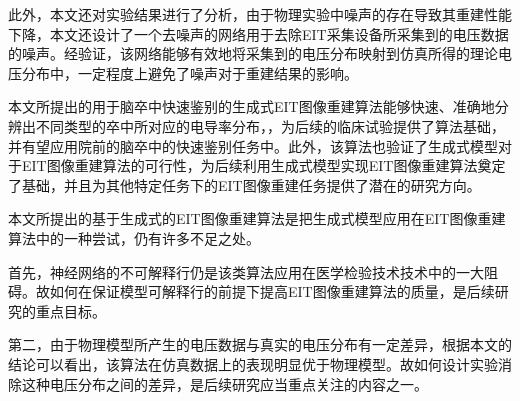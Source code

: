此外，本文还对实验结果进行了分析，由于物理实验中噪声的存在导致其重建性能下降，本文还设计了一个去噪声的网络用于去除EIT采集设备所采集到的电压数据的噪声。经验证，该网络能够有效地将采集到的电压分布映射到仿真所得的理论电压分布中，一定程度上避免了噪声对于重建结果的影响。
 
本文所提出的用于脑卒中快速鉴别的生成式EIT图像重建算法能够快速、准确地分辨出不同类型的卒中所对应的电导率分布，，为后续的临床试验提供了算法基础，并有望应用院前的脑卒中的快速鉴别任务中。此外，该算法也验证了生成式模型对于EIT图像重建算法的可行性，为后续利用生成式模型实现EIT图像重建算法奠定了基础，并且为其他特定任务下的EIT图像重建任务提供了潜在的研究方向。
 
 
本文所提出的基于生成式的EIT图像重建算法是把生成式模型应用在EIT图像重建算法中的一种尝试，仍有许多不足之处。
 
首先，神经网络的不可解释行仍是该类算法应用在医学检验技术技术中的一大阻碍。故如何在保证模型可解释行的前提下提高EIT图像重建算法的质量，是后续研究的重点目标。
 
第二，由于物理模型所产生的电压数据与真实的电压分布有一定差异，根据本文的结论可以看出，该算法在仿真数据上的表现明显优于物理模型。故如何设计实验消除这种电压分布之间的差异，是后续研究应当重点关注的内容之一。